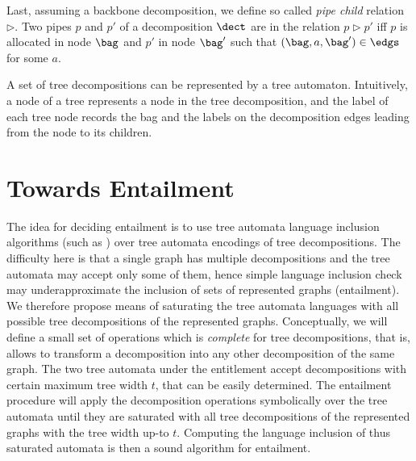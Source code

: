 {Last, assuming a backbone decomposition, we define so called \emph{pipe child} relation $\rhd$.
Two pipes $p$ and $p'$ of a decomposition $\dect$ are in the relation $p \rhd p'$ iff $p$ is allocated in node $\bag$ and $p'$ in node $\bag'$
such that $(\bag,a,\bag') \in \edgs$ for some $a$.

A set of tree decompositions can be represented by a tree automaton. 
Intuitively, a node of a tree represents a node in the tree decomposition, and the label of each tree node records the bag and the labels on the decomposition edges leading from the node to its children. %
%

\section{Towards Entailment}
The idea for deciding entailment is to use tree automata language inclusion algorithms (such as \cite{tacas2010,almeida_reduction_2016,abdulla_computing_2008,libvata}) over tree automata encodings of tree decompositions.
The difficulty here is that a single graph has multiple decompositions and the tree automata may accept only some of them, hence simple language inclusion check may underapproximate the inclusion of sets of represented graphs (entailment).
%
We therefore propose means of saturating the tree automata languages with all possible tree decompositions of the represented graphs.
Conceptually, we will define a small set of operations which is \emph{complete} for tree decompositions, that is, allows to transform a decomposition into any other decomposition of the same graph.
%
The two tree automata under the entitlement accept decompositions with certain maximum tree width $t$, that can be easily determined.
%
The entailment procedure will apply the decomposition operations symbolically over the tree automata until they are saturated with all tree decompositions of the represented graphs with the tree width up-to $t$.
%
Computing the language inclusion of thus saturated automata is then a sound algorithm for entailment.



}
